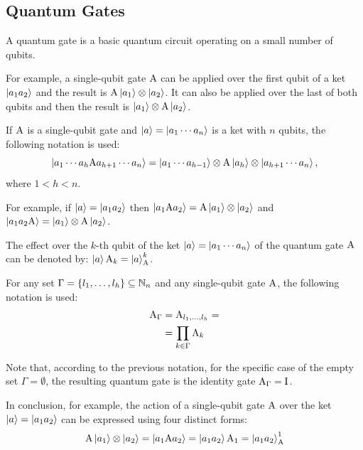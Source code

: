 \documentclass[sigconf,natbib=false]{acmart}
\begin{document}
	\subsection{Quantum Gates}
	A quantum gate is a basic quantum circuit operating on a small number of qubits.

	For example, a single-qubit gate $\text{A}$   can be applied over the first qubit of a ket $\ket{a_1a_2} $ and the result is $\text{A}\ket{a_1}\otimes \ket{a_2}$. It can also be applied over the last of both qubits and then the result is $\ket{a_1}\otimes \text{A}\ket{a_2}$.

	\begin{notation}
		If $\text{A}$ is a single-qubit  gate and $\ket{a}=\ket{a_1\cdots a_n}$ is a ket with $n$ qubits, the following notation is used:
		\[\ket{a_1\cdots a_h\text{A}a_{h+1}\cdots a_n}=\ket{a_1\cdots a_{h-1}}\otimes\text{A}\ket{a_h}\otimes \ket{a_{h+1}\cdots a_n},\] where $1<h<n$.
	\end{notation}
	For example, if $\ket{a}=\ket{a_1a_2}$ then
	$\ket{a_1\text{A}a_2} = \text{A}\ket{a_1}\otimes \ket{a_2}$ and $\ket{a_1a_2\text{A}} =\ket{a_1}\otimes \text{A}\ket{a_2}$.

	\begin{notation}
		The effect over the $k$-th qubit of the  ket $\ket{a}=\ket{a_1\cdots a_n}$ of the quantum gate $\text{A}$ can be denoted by:  $\ket{a}\text{A}_k=\ket{a}^{k}_{\text{A}}$.
	\end{notation}

	\begin{notation}
		For any set $\Gamma=\{l_1,\dots,l_h\}\subseteq\mathbb{N}_n$ and any single-qubit gate $\text{A}$, the following notation is used:
		\begin{align}
			\text{A}_{\Gamma} &= \text{A}_{l_1,\dots,l_h}=\\
			&=\prod_{k\in\Gamma}\text{A}_k
		\end{align}
	\end{notation}

	Note that, according to the previous notation, for the specific case of the empty set $\Gamma=\emptyset$, the resulting quantum gate is the identity gate $\text{A}_\Gamma=\text{I}$.

	In conclusion, for example,  the action of a single-qubit gate $\text{A}$ over the ket $\ket{a}=\ket{a_1a_2}$ can be expressed using four distinct forms:
	\begin{equation*}
		\text{A}\ket{a_1}\otimes \ket{a_2} = \ket{a_1\text{A}a_2}= \ket{a_1a_2}\text{A}_1= \ket{a_1a_2}^{1}_{\text{A}}
	\end{equation*}
\end{document}
